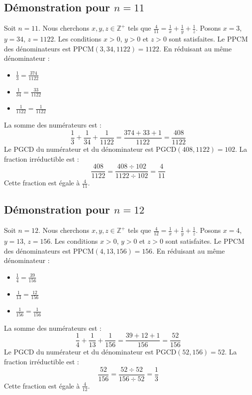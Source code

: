 \documentclass[11pt,a4paper]{article}
\begin{document}
\subsection{Démonstration pour $n = 11$}
Soit $n = 11$. Nous cherchons $x, y, z \in \mathbb{Z}^{+}$ tels que $\frac{4}{11} = \frac{1}{x} + \frac{1}{y} + \frac{1}{z}$.
Posons $x = 3$, $y = 34$, $z = 1122$.
Les conditions $x > 0$, $y > 0$ et $z > 0$ sont satisfaites.
Le PPCM des dénominateurs est $\text{PPCM}(3, 34, 1122) = 1122$.
En réduisant au même dénominateur :
\begin{itemize}
    \item $\frac{1}{3} = \frac{374}{1122}$
    \item $\frac{1}{34} = \frac{33}{1122}$
    \item $\frac{1}{1122} = \frac{1}{1122}$
\end{itemize}
La somme des numérateurs est :
$$ \frac{1}{3} + \frac{1}{34} + \frac{1}{1122} = \frac{374 + 33 + 1}{1122} = \frac{408}{1122} $$
Le PGCD du numérateur et du dénominateur est $\text{PGCD}(408, 1122) = 102$.
La fraction irréductible est :
$$ \frac{408}{1122} = \frac{408 \div 102}{1122 \div 102} = \frac{4}{11} $$
Cette fraction est égale à $\frac{4}{11}$.

\subsection{Démonstration pour $n = 12$}
Soit $n = 12$. Nous cherchons $x, y, z \in \mathbb{Z}^{+}$ tels que $\frac{4}{12} = \frac{1}{x} + \frac{1}{y} + \frac{1}{z}$.
Posons $x = 4$, $y = 13$, $z = 156$.
Les conditions $x > 0$, $y > 0$ et $z > 0$ sont satisfaites.
Le PPCM des dénominateurs est $\text{PPCM}(4, 13, 156) = 156$.
En réduisant au même dénominateur :
\begin{itemize}
    \item $\frac{1}{4} = \frac{39}{156}$
    \item $\frac{1}{13} = \frac{12}{156}$
    \item $\frac{1}{156} = \frac{1}{156}$
\end{itemize}
La somme des numérateurs est :
$$ \frac{1}{4} + \frac{1}{13} + \frac{1}{156} = \frac{39 + 12 + 1}{156} = \frac{52}{156} $$
Le PGCD du numérateur et du dénominateur est $\text{PGCD}(52, 156) = 52$.
La fraction irréductible est :
$$ \frac{52}{156} = \frac{52 \div 52}{156 \div 52} = \frac{1}{3} $$
Cette fraction est égale à $\frac{4}{12}$.
\end{document}
